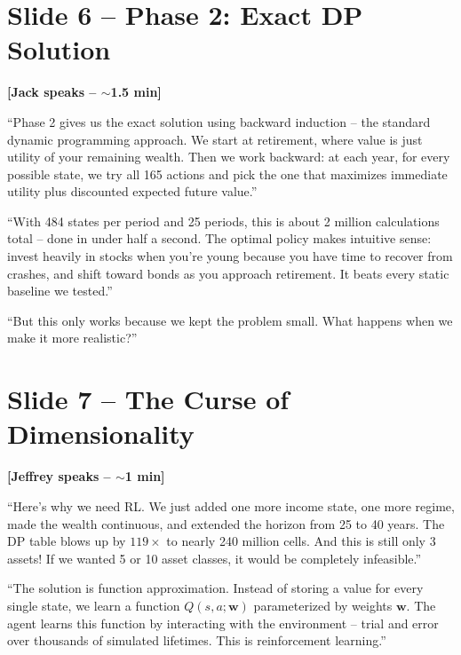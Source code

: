 \documentclass[11pt, letterpaper]{article}
\begin{document}
\section{Slide 6 -- Phase 2: Exact DP Solution}

\textbf{[Jack speaks -- $\sim$1.5 min]}

``Phase 2 gives us the exact solution using backward induction -- the standard dynamic programming approach. We start at retirement, where value is just utility of your remaining wealth. Then we work backward: at each year, for every possible state, we try all 165 actions and pick the one that maximizes immediate utility plus discounted expected future value.''

``With 484 states per period and 25 periods, this is about 2 million calculations total -- done in under half a second. The optimal policy makes intuitive sense: invest heavily in stocks when you're young because you have time to recover from crashes, and shift toward bonds as you approach retirement. It beats every static baseline we tested.''

``But this only works because we kept the problem small. What happens when we make it more realistic?''

\section{Slide 7 -- The Curse of Dimensionality}

\textbf{[Jeffrey speaks -- $\sim$1 min]}

``Here's why we need RL. We just added one more income state, one more regime, made the wealth continuous, and extended the horizon from 25 to 40 years. The DP table blows up by $119\times$ to nearly 240 million cells. And this is still only 3 assets! If we wanted 5 or 10 asset classes, it would be completely infeasible.''

``The solution is function approximation. Instead of storing a value for every single state, we learn a function $Q(s,a;\mathbf{w})$ parameterized by weights $\mathbf{w}$. The agent learns this function by interacting with the environment -- trial and error over thousands of simulated lifetimes. This is reinforcement learning.''

\end{document}
